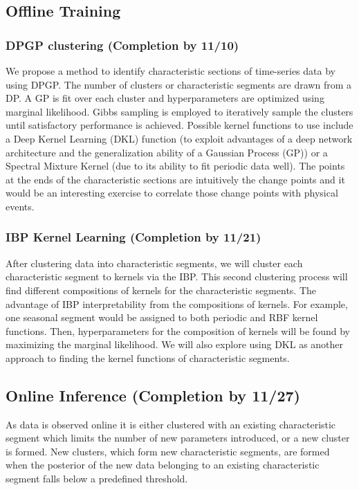 \documentclass{article}
\begin{document}
\subsection{Offline Training}
\subsubsection{DPGP clustering (Completion by 11/10)}
We propose a method to identify characteristic sections of time-series data by using DPGP. The number of clusters or characteristic segments are drawn from a DP. A GP is fit over each cluster and hyperparameters are optimized using marginal likelihood. Gibbs sampling is employed to iteratively sample the clusters until satisfactory performance is achieved. Possible kernel functions to use include a Deep Kernel Learning (DKL) function (to exploit advantages of a deep network architecture and the generalization ability of a Gaussian Process (GP)) or a Spectral Mixture Kernel (due to its ability to fit periodic data well). The points at the ends of the characteristic sections are intuitively the change points and it would be an interesting exercise to correlate those change points with physical events. 
\subsubsection{IBP Kernel Learning (Completion by 11/21)}
After clustering data into characteristic segments, we will cluster each characteristic segment to kernels via the IBP. This second clustering process will find different compositions of kernels for the characteristic segments. The advantage of IBP interpretability from the compositions of kernels. For example, one seasonal segment would be assigned to both periodic and RBF kernel functions. Then, hyperparameters for the composition of kernels will be found by maximizing the marginal likelihood. We will also explore using DKL as another approach to finding the kernel functions of characteristic segments.
\subsection{Online Inference (Completion by 11/27)}
As data is observed online it is either clustered with an existing characteristic segment which limits the number of new parameters introduced, or a new cluster is formed. New clusters, which form new characteristic segments, are formed when the posterior of the new data belonging to an existing characteristic segment falls below a predefined threshold.
  
\end{document}
